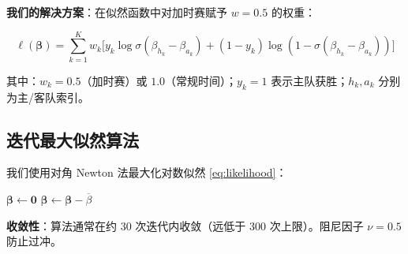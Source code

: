 \documentclass[11pt, a4paper]{article}
\begin{document}
\textbf{我们的解决方案}：在似然函数中对加时赛赋予 $w = 0.5$ 的权重：

\begin{equation}
\ell(\boldsymbol{\beta}) = \sum_{k=1}^{K} w_k \Big[ y_k \log \sigma(\beta_{h_k} - \beta_{a_k}) + (1-y_k) \log(1 - \sigma(\beta_{h_k} - \beta_{a_k})) \Big]
\label{eq:likelihood}
\end{equation}

其中：$w_k = 0.5$（加时赛）或 $1.0$（常规时间）；$y_k = 1$ 表示主队获胜；$h_k, a_k$ 分别为主/客队索引。

\subsection{迭代最大似然算法}

我们使用对角 Newton 法最大化对数似然 \eqref{eq:likelihood}：

\begin{algorithm}[H]
\SetAlgoLined
{}
$\boldsymbol{\beta} \leftarrow \mathbf{0}$\;
$\boldsymbol{\beta} \leftarrow \boldsymbol{\beta} - \overline{\beta}$ 
\Return{$\boldsymbol{\beta}$}
\caption{加时赛感知 Bradley-Terry 迭代 MLE 算法}
\label{alg:bt}
\end{algorithm}

\noindent\textbf{收敛性}：算法通常在约 30 次迭代内收敛（远低于 300 次上限）。阻尼因子 $\nu = 0.5$ 防止过冲。

\end{document}
